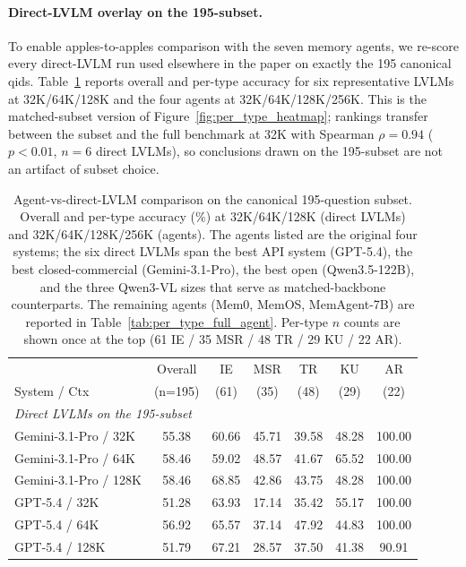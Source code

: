 \documentclass{article}
\begin{document}
\paragraph{Direct-LVLM overlay on the 195-subset.}
To enable apples-to-apples comparison with the seven memory agents, we re-score every direct-LVLM run used elsewhere in the paper on exactly the 195 canonical qids. Table~\ref{tab:agent_vs_vlm_195} reports overall and per-type accuracy for six representative LVLMs at 32K/64K/128K and the four agents at 32K/64K/128K/256K. This is the matched-subset version of Figure~\ref{fig:per_type_heatmap}; rankings transfer between the subset and the full benchmark at 32K with Spearman $\rho = 0.94$ ($p < 0.01$, $n = 6$ direct LVLMs), so conclusions drawn on the 195-subset are not an artifact of subset choice.

\begin{table}[h]
\centering
\scriptsize
\setlength{\tabcolsep}{3pt}
\caption{Agent-vs-direct-LVLM comparison on the canonical 195-question subset. Overall and per-type accuracy (\%) at 32K/64K/128K (direct LVLMs) and 32K/64K/128K/256K (agents). The agents listed are the original four systems; the six direct LVLMs span the best API system (GPT-5.4), the best closed-commercial (Gemini-3.1-Pro), the best open (Qwen3.5-122B), and the three Qwen3-VL sizes that serve as matched-backbone counterparts. The remaining agents (Mem0, MemOS, MemAgent-7B) are reported in Table~\ref{tab:per_type_full_agent}. Per-type $n$ counts are shown once at the top (61 IE / 35 MSR / 48 TR / 29 KU / 22 AR).}
\label{tab:agent_vs_vlm_195}
\begin{tabular}{@{}lcccccc@{}}
\toprule
 & Overall & IE & MSR & TR & KU & AR \\
System / Ctx & (n=195) & (61) & (35) & (48) & (29) & (22) \\
\midrule
\multicolumn{7}{l}{\emph{Direct LVLMs on the 195-subset}} \\
Gemini-3.1-Pro / 32K      & 55.38 & 60.66 & 45.71 & 39.58 & 48.28 & 100.00 \\
Gemini-3.1-Pro / 64K      & 58.46 & 59.02 & 48.57 & 41.67 & 65.52 & 100.00 \\
Gemini-3.1-Pro / 128K     & 58.46 & 68.85 & 42.86 & 43.75 & 48.28 & 100.00 \\
GPT-5.4 / 32K             & 51.28 & 63.93 & 17.14 & 35.42 & 55.17 & 100.00 \\
GPT-5.4 / 64K             & 56.92 & 65.57 & 37.14 & 47.92 & 44.83 & 100.00 \\
GPT-5.4 / 128K            & 51.79 & 67.21 & 28.57 & 37.50 & 41.38 &  90.91 \\

\end{tabular}
\end{table}
\end{document}
